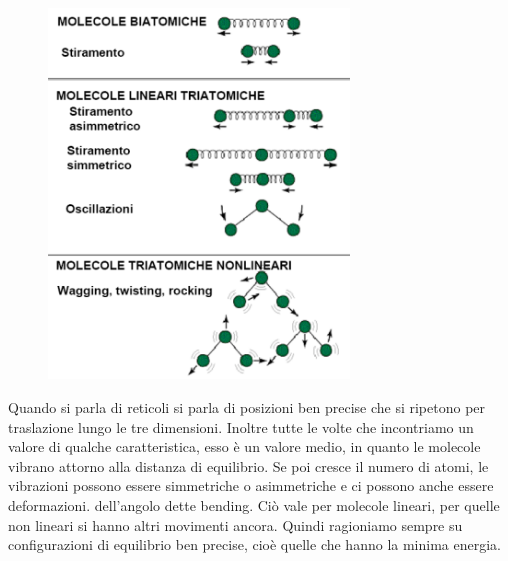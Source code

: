\begin{figure}[H]
    \centering
    \includegraphics[width=8cm]{immagini/vibrazioni.png}
\end{figure}

Quando si parla di reticoli si parla di posizioni ben precise che si ripetono per traslazione lungo le tre dimensioni. Inoltre tutte le volte che incontriamo un valore di qualche caratteristica, esso è un valore medio, in quanto le molecole vibrano attorno alla distanza di equilibrio. Se poi cresce il numero di atomi, le vibrazioni possono essere simmetriche o asimmetriche e ci possono anche essere deformazioni. dell'angolo dette bending. Ciò vale per molecole lineari, per quelle non lineari si hanno altri movimenti ancora. Quindi ragioniamo sempre su configurazioni di equilibrio ben precise, cioè quelle che hanno la minima energia.
